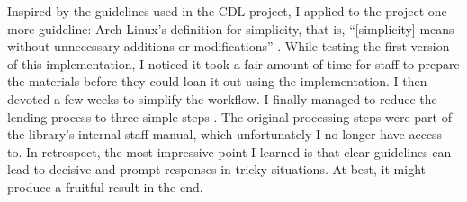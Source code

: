 \documentclass[12pt,a4paper]{article}
\begin{document}
Inspired by the guidelines used in the CDL project, I applied to the project one more guideline: Arch Linux’s definition for simplicity, that is, “[simplicity] means without unnecessary additions or modifications” \parencite{Archwiki}. While testing the first version of this implementation, I noticed it took a fair amount of time for staff to prepare the materials before they could loan it out using the implementation. I then devoted a few weeks to simplify the workflow. I finally managed to reduce the lending process to three simple steps \parencite{Linerre2023}. The original processing steps were part of the library’s internal staff manual, which unfortunately I no longer have access to.
In retrospect, the most impressive point I learned is that clear guidelines can lead to decisive and prompt responses in tricky situations. At best, it might produce a fruitful result in the end.

\printbibliography
% 
\end{document}
